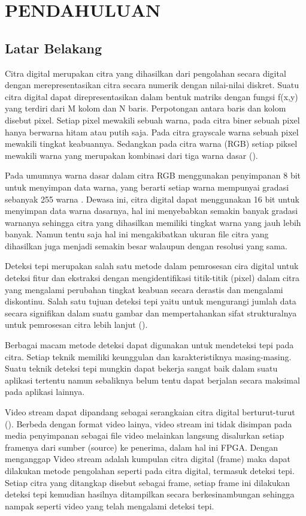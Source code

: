 
\chapter{PENDAHULUAN}

\section{Latar Belakang}
Citra digital merupakan citra yang dihasilkan dari pengolahan secara digital dengan merepresentasikan citra secara numerik dengan nilai-nilai diskret. Suatu citra digital dapat direpresentasikan dalam bentuk matriks dengan fungsi f(x,y) yang terdiri dari M kolom dan N baris. Perpotongan antara baris dan kolom disebut pixel. Setiap pixel mewakili sebuah warna, pada citra biner sebuah pixel hanya berwarna hitam atau putih saja. Pada citra grayscale warna sebuah pixel mewakili tingkat keabuannya. Sedangkan pada citra warna (RGB) setiap piksel mewakili warna yang merupakan kombinasi dari tiga warna dasar (\cite{book:darma}).


Pada umumnya warna dasar dalam citra RGB menggunakan penyimpanan 8 bit untuk menyimpan data warna, yang berarti setiap warna mempunyai gradasi sebanyak 255 warna . Dewasa ini, citra digital dapat menggunakan 16 bit untuk menyimpan data warna dasarnya, hal ini menyebabkan semakin banyak gradasi warnanya sehingga citra yang dihasilkan memiliki tingkat warna yang jauh lebih banyak. Namun tentu saja hal ini mengakibatkan ukuran file citra yang dihasilkan juga menjadi semakin besar walaupun dengan resolusi yang sama.

Deteksi tepi merupakan salah satu metode dalam pemrosesan cira digital untuk deteksi fitur dan ekstraksi dengan mengidentifikasi titik-titik (pixel) dalam citra yang mengalami perubahan tingkat keabuan secara derastis dan mengalami diskontinu. Salah satu tujuan deteksi tepi yaitu untuk mengurangi jumlah data secara signifikan dalam suatu gambar dan mempertahankan sifat strukturalnya untuk pemrosesan citra lebih lanjut (\cite{rashmi}).

Berbagai macam metode deteksi dapat digunakan untuk mendeteksi tepi pada citra. Setiap teknik memiliki keunggulan dan karakteristiknya masing-masing. Suatu teknik deteksi tepi mungkin dapat bekerja sangat baik dalam suatu aplikasi tertentu namun sebaliknya belum tentu dapat berjalan secara maksimal pada aplikasi lainnya.

Video stream dapat dipandang sebagai serangkaian citra digital berturut-turut (\cite{thesis:jin}). Berbeda dengan format video lainya, video stream ini tidak disimpan pada media penyimpanan sebagai file video melainkan langsung disalurkan setiap framenya dari sumber (source) ke penerima, dalam hal ini FPGA.  Dengan menganggap Video stream adalah kumpulan citra digital (frame) maka dapat dilakukan metode pengolahan seperti pada citra digital, termasuk deteksi tepi. Setiap citra yang ditangkap disebut sebagai frame, setiap frame ini dilakukan deteksi tepi kemudian hasilnya ditampilkan secara berkesinambungan sehingga nampak seperti video yang telah mengalami deteksi tepi. 

